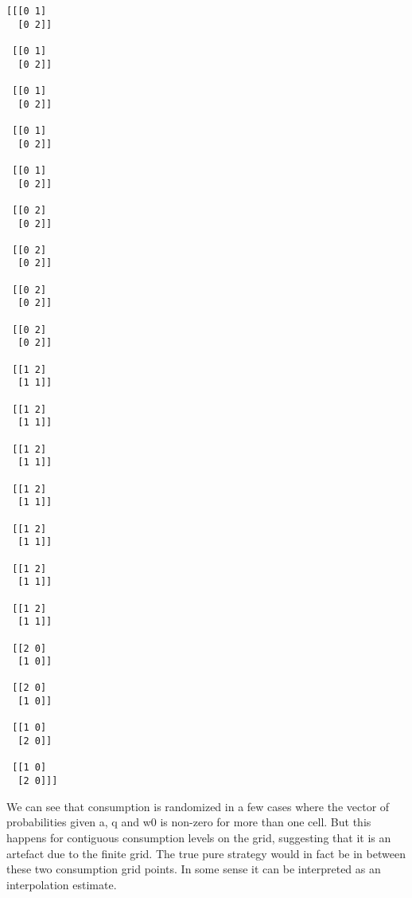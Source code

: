 \documentclass[11pt]{article}
\begin{document}
    \begin{Verbatim}[commandchars=\\\{\}]
[[[0 1]
  [0 2]]

 [[0 1]
  [0 2]]

 [[0 1]
  [0 2]]

 [[0 1]
  [0 2]]

 [[0 1]
  [0 2]]

 [[0 2]
  [0 2]]

 [[0 2]
  [0 2]]

 [[0 2]
  [0 2]]

 [[0 2]
  [0 2]]

 [[1 2]
  [1 1]]

 [[1 2]
  [1 1]]

 [[1 2]
  [1 1]]

 [[1 2]
  [1 1]]

 [[1 2]
  [1 1]]

 [[1 2]
  [1 1]]

 [[1 2]
  [1 1]]

 [[2 0]
  [1 0]]

 [[2 0]
  [1 0]]

 [[1 0]
  [2 0]]

 [[1 0]
  [2 0]]]
    \end{Verbatim}

    We can see that consumption is randomized in a few cases where the
vector of probabilities given a, q and w0 is non-zero for more than one
cell. But this happens for contiguous consumption levels on the grid,
suggesting that it is an artefact due to the finite grid. The true pure
strategy would in fact be in between these two consumption grid points.
In some sense it can be interpreted as an interpolation estimate.
\end{document}
